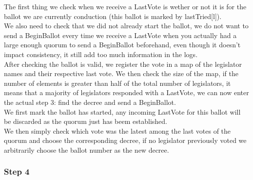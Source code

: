 \documentclass{article}
\begin{document}
The first thing we check when we receive a LastVote is wether or not it is for the ballot we are currently conduction (this ballot is marked by lastTried[l]).\\
We also need to check that we did not already start the ballot, we do not want to send a BeginBallot every time we receive a LastVote when you actually had a large enough quorum to send a BeginBallot beforehand, even though it doesn't impact consistency, it still add too much information in the logs.\\
After checking the ballot is valid, we register the vote in a map of the legislator names and their respective last vote. We then check the size of the map, if the number of elements is greater than half of the total number of legislators, it means that a majority of legislators responded with a LastVote, we can now enter the actual step 3: find the decree and send a BeginBallot.\\
We first mark the ballot has started, any incoming LastVote for this ballot will be discarded as the quorum just has beem established.\\
We then simply check which vote was the latest among the last votes of the quorum and choose the corresponding decree, if no legislator previously voted we arbitrarily choose the ballot number as the new decree.

\subsubsection{Step 4}
\end{document}

